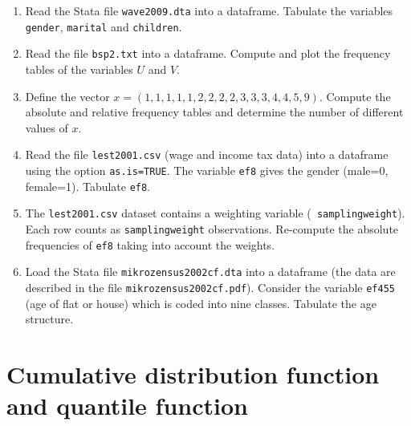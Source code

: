 \documentclass{article}
\begin{document}
\begin{enumerate}
\item Read the Stata file \texttt{wave2009.dta} into a dataframe. Tabulate
the variables \texttt{gender}, \texttt{marital} and \texttt{children}.

\item Read the file \texttt{bsp2.txt} into a dataframe. Compute and plot the
frequency tables of the variables $U$ and $V.$

\item Define the vector $x=(1,1,1,1,1,2,2,2,2,3,3,3,4,4,5,9)$. Compute the
absolute and relative frequency tables and determine the number of different
values of $x.$

\item Read the file \texttt{lest2001.csv} (wage and income tax data) into a
dataframe using the option \texttt{as.is=TRUE}. The variable \texttt{ef8}
gives the gender (male=0, female=1). Tabulate \texttt{ef8}.

\item The \texttt{lest2001.csv} dataset contains a weighting variable (\texttt{%
samplingweight}). Each row counts as \texttt{samplingweight} observations.
Re-compute the absolute frequencies of \texttt{ef8} taking into account the
weights.

\item Load the Stata file \texttt{mikrozensus2002cf.dta} into a dataframe
(the data are described in the file \texttt{mikrozensus2002cf.pdf}).
Consider the variable \texttt{ef455} (age of flat or house) which is coded
into nine classes. Tabulate the age structure.
\end{enumerate}
\newpage


\section{Cumulative distribution function and quantile function}
\end{document}
